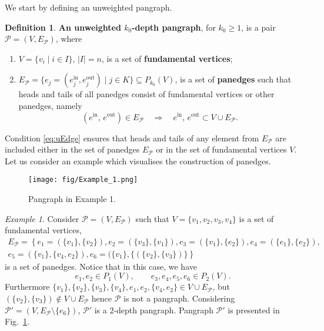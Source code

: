 \documentclass[a4paper,12pt]{article}
\theoremstyle{definition}
\newtheorem{definition}{Definition}
\theoremstyle{remark}
\newtheorem{exam}{Example}
\newcommand{\mP}{\mathcal{P}}
\newcommand{\EP}{E_{\mathcal{P}}}
\newcommand{\tin}{\mathrm{in}}
\newcommand{\out}{\mathrm{out}}
\begin{document}
We start by defining an unweighted pangraph. 

\begin{definition} 
\label{def:weighted_pangraph}
\textbf{An unweighted $k_0$-depth pangraph}, for $k_0\geq 1$, is a pair $\mP= (V,\EP)$, where
    \begin{enumerate}
        \item $V = \{v_i\; | \; i \in I\}$, $|I|=n$, is a set of \textbf{fundamental vertices};
        \item $E_{\mP} = \{e_j =(e_{j}^{\tin},e_{j}^{\out}) \; | \; j \in K\}\subseteq P_{k_0}(V)$, is a set of \textbf{panedges} such that heads and tails of all panedges consist of fundamental vertices or other panedges, namely
        \begin{equation}\label{eq:uEdge}
          (e^{\tin},\, e^{\out}) \in \EP \quad \Rightarrow \quad e^{\tin},\, e^{\out}  \subset V \cup \EP.
        \end{equation} 
    \end{enumerate} 
\end{definition} 

Condition \eqref{eq:uEdge} ensures that heads and tails of any element from $E_{\mP}$ are included either in the set of panedges $E_{\mP}$ or in the set of fundamental vertices $V$. Let us consider an example which visualises the construction of panedges.

\begin{figure}
    \centering
    \texttt{[image: fig/Example\_1.png]}
    \caption{Pangraph in Example 1.}\label{fig:example_1}
\end{figure}


\begin{exam}\label{exam:pangr}
Consider $\mP=(V,\EP)$ such that $V=\{v_1,v_2,v_3,v_4\}$ is a set of fundamental vertices, 
\begin{eqnarray*}
E_{\mP}=\left\{ e_1 = (\{v_1\},\{v_2\}), e_2 = (\{v_3\},\{v_1\} ), e_3 =(\{v_1\}, \{e_2\} ), e_4 =( \{e_1\} , \{e_2\} ),\right. \\
\left.e_5 = (\{v_1\},\{v_4,e_2\}),e_6=(\{v_1\}, \{(\{v_2\},\{v_3\})\}\right\}
\end{eqnarray*} 
is a set of panedges.
Notice that in this case, we have
$$
e_1, e_2 \in P_1(V),\qquad e_3, e_4, e_5, e_6\in P_2(V). 
$$
Furthermore $\{v_1\},\{v_2\},\{v_3\},\{v_4\}, e_1 , e_2, \{v_4,e_2\} \in V \cup \EP $, but $ (\{v_2\},\{v_3\})\notin V \cup \EP $ hence $\mP$ is not a pangraph. Considering $\mP'=(V,\EP \setminus \{e_6\})$, $\mathcal{P}'$ is a $2$-depth pangraph. Pangraph $\mathcal{P}'$ is  presented in Fig.~\ref{fig:example_1}. 
\end{exam}
\end{document}
